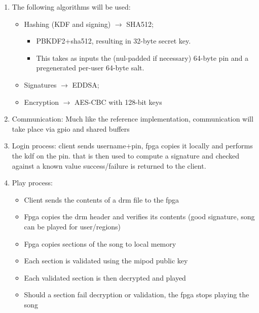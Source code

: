 \documentclass[11pt]{extarticle}
\begin{document}
\begin{enumerate}
    \item The following algorithms will be used: 
    \begin{itemize}
        \item Hashing (KDF and signing) $\rightarrow$ SHA512; 
            \begin{itemize}
                \item PBKDF2+sha512, resulting in 32-byte secret key.  
                \item This takes as inputs the (nul-padded if necessary) 64-byte pin and a pregenerated per-user 64-byte salt. 
            \end{itemize}
        \item Signatures $\rightarrow$ EDDSA; 
        \item Encryption $\rightarrow$ AES-CBC with 128-bit keys
    \end{itemize}

    \item Communication:  Much like the reference implementation, communication will take place via gpio and shared buffers
    
    \item Login process: client sends username+pin, fpga copies it locally and performs the kdf on the pin. 
    that is then used to compute a signature and checked against a known value success/failure is returned to the client.
    
    \item Play process:
    \begin{itemize}
        \item Client sends the contents of a drm file to the fpga
        \item Fpga copies the drm header and verifies its contents (good signature, song can be played for user/regions)
        \item Fpga copies sections of the song to local memory
        \item Each section is validated using the mipod public key
        \item Each validated section is then decrypted and played
        \item Should a section fail decryption or validation, the fpga stops playing the song
    \end{itemize}


\end{enumerate}
\end{document}
